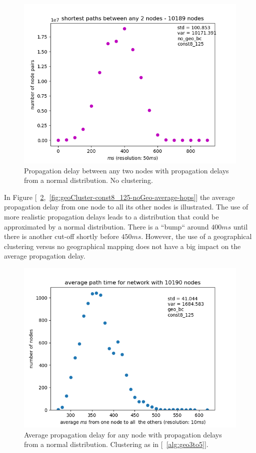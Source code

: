 \documentclass[a4paper, oneside]{discothesis}
\begin{document}
\begin{figure}
    \centering
    \includegraphics[width=.8\columnwidth]{figures/geoCluster/const8_125/noGeo/final-shortest-paths-between-any-nodes-10189-nodes.png}
    \caption{Propagation delay between any two nodes with propagation delays from a normal distribution. No clustering.}
    \label{fig:geoCluster-const8_125-noGeo-shortest-path}
\end{figure}

In Figure [~\ref{fig:geoCluster-const8_125-geo-average-hops},~\ref{fig:geoCluster-const8_125-noGeo-average-hops}] the average propagation delay from one node to all its other nodes is illustrated.
The use of more realistic propagation delays leads to a distribution that could be approximated by a normal distribution. There is a ``bump`` around $400ms$ until there is another cut-off shortly before $450ms$. However, the use of a geographical clustering versus no geographical mapping does not have a big impact on the average propagation delay.

\begin{figure}
    \centering
    \includegraphics[width=.8\columnwidth]{figures/geoCluster/const8_125/geo/average-hops-for-network-with-10190-nodes.png}
    \caption{Average propagation delay for any node with propagation delays from a normal distribution. Clustering as in [~\ref{alg:geo3to5}].}
    \label{fig:geoCluster-const8_125-geo-average-hops}
\end{figure}
\end{document}
